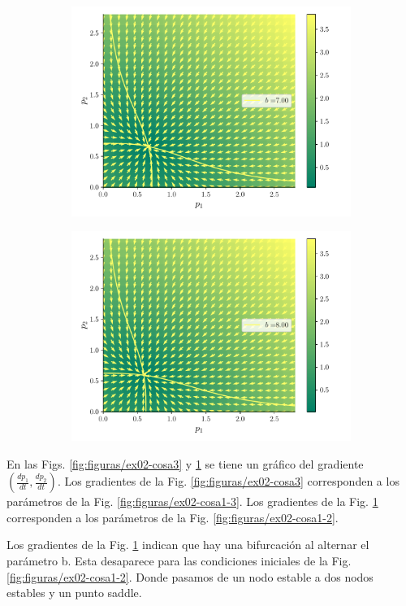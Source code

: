 \documentclass[twocolumn,aps,prl]{revtex4-1}
\begin{document}
\begin{figure}[ht!]
\begin{subfigure}[b]{0.49\linewidth}
      \includegraphics[width = 0.999\textwidth]{figuras/ex02-cosa2-6.pdf}
  \end{subfigure}\quad
  \begin{subfigure}[b]{0.49\linewidth}
      \centering
      \includegraphics[width = 0.999\textwidth]{figuras/ex02-cosa2-7.pdf}
  \end{subfigure}\quad
  \caption{}
  \label{fig:figuras/ex02-cosa2}
\end{figure}

En las Figs. \ref{fig:figuras/ex02-cosa3} y \ref{fig:figuras/ex02-cosa2} se tiene un gráfico del gradiente $(\frac{dp_1}{dt}, \frac{dp_2}{dt})$. 
Los gradientes de la Fig. \ref{fig:figuras/ex02-cosa3} corresponden a los parámetros de la Fig. \ref{fig:figuras/ex02-cosa1-3}.
Los gradientes de la Fig. \ref{fig:figuras/ex02-cosa2} corresponden a los parámetros de la Fig. \ref{fig:figuras/ex02-cosa1-2}. 

Los gradientes de la Fig. \ref{fig:figuras/ex02-cosa2} indican que hay una bifurcación al alternar el parámetro b. Esta desaparece para las condiciones iniciales de la Fig. \ref{fig:figuras/ex02-cosa1-2}. Donde pasamos de un nodo estable a dos nodos estables y un punto saddle.



% 
\end{document}
